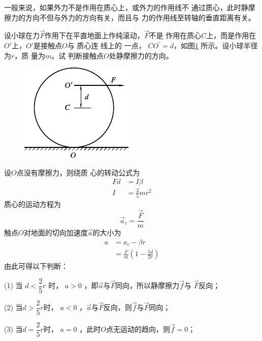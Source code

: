 一般来说，如果外力不是作用在质心上，或外力的作用线不
通过质心，此时静摩擦力的方向不但与外力的方向有关，而且与
力的作用线至转轴的垂直距离有关。

\example 设小球在力$ \vec{F} $作用下在平直地面上作纯滚动，$ \vec{F} $不是
作用在质心$ C $上，而是作用在$ O' $上，$ O' $是接触点$ O $与
质心连
\clearpage\noindent
线上的
一点， $ C O ^ { \prime } = d $，如图\ref{fig:10.18} 所示。设小球半径为$ r $，质
量为$ m $。试
判断接触点$ O $处静摩擦力的方向。

\begin{figure}
  \centering
  \includegraphics{figure/fig10.18}
  \caption{}
  \label{fig:10.18}
\end{figure}
\solution 设$ O $点没有摩擦力，则绕质
心的转动公式为
\begin{equation*}
  \begin{split}
    F d &= I \beta \\
    I &= \frac { 2 } { 5 } m r ^ { 2 }
  \end{split}
\end{equation*}
质心的运动方程为
\begin{equation*}
  \vec{a} _ { c } = \frac { \vec{F} } { m }
\end{equation*}
触点$ O $对地面的切向加速度$ \vec{a} $的大小为
\begin{equation*}
  \begin{split}
    a &= a _ { c } - \beta r \\
    &= \frac { F } { m } \left( 1 - \frac { 5 d } { 2 r } \right)
  \end{split}
\end{equation*}
由此可得以下判断：

(1) 当 $ d < \dfrac { 2 } { 5 } r $ 时， $ a > 0 $ ，即$ \vec{a} $与$ \vec{F} $同向，所以静摩擦力$ \vec{f} $与
$ \vec{F} $反向；

(2) 当$ d > \dfrac { 2 } { 5 } r $时， $ a < 0 $ ，$ \vec{a} $与$ \vec{F} $反向，则$ \vec{f} $与$ \vec{F} $同向；

(3) 当$ d = \dfrac { 2 } { 5 } r $时， $ a = 0 $ ，此时$ O $点无运动的趋向，则$ \vec{f} = 0 $；

